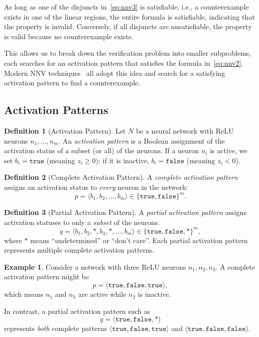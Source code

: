 \documentclass[oneside,11pt,dvipsnames]{book}
\numberwithin{equation}{section}
\theoremstyle{definition}
\newtheorem{definition}{Definition}[section]
\newtheorem{example}{Example}[section]
\theoremstyle{remark}
\begin{document}
As long as one of the disjuncts in~\autoref{eq:nnv3} is satisfiable, i.e., a counterexample exists in one of the linear regions, the entire formula is satisfiable, indicating that the property is invalid. Conversely, if all disjuncts are unsatisfiable, the property is valid because no counterexample exists.

This allows us to break down the verification problem into smaller subproblems, each searches for an activation pattern that satisfies the formula in~\autoref{eq:nnv2}.
Modern NNV techniques~\cite{bunel2020branch,wang2021beta,ferrari2022complete,duong2024harnessing,duong2023dpllt,ovalbab,katz2019marabou,bak2021nnenum} all adopt this idea and search for a satisfying activation pattern to find a counterexample.

\subsection{Activation Patterns}
\begin{definition}[Activation Pattern]\label{def:activation-pattern}
Let $N$ be a neural network with ReLU neurons $n_1,\dots,n_m$.
An \emph{activation pattern} is a Boolean assignment of the activation status of a subset (or all) of the neurons.
If a neuron $n_i$ is active, we set $b_i = \texttt{true}$ (meaning $z_i \geq 0$); if it is inactive, $b_i = \texttt{false}$ (meaning $z_i < 0$).
\end{definition}

\begin{definition}[Complete Activation Pattern]\label{def:complete-pattern}
A \emph{complete activation pattern} assigns an activation status to \emph{every} neuron in the network:
\[
p = \langle b_1, b_2, \dots, b_m \rangle \in \{\texttt{true},\texttt{false}\}^m .
\]
\end{definition}


\begin{definition}[Partial Activation Pattern]\label{def:partial-pattern}
A \emph{partial activation pattern} assigns activation statuses to only a \emph{subset} of the neurons.
\[
q = \langle b_1, b_2, *, b_4, *, \dots, b_m \rangle \in \{\texttt{true},\texttt{false},*\}^m ,
\]
where $*$ means ``undetermined'' or ``don't care''. Each partial activation pattern represents multiple complete activation patterns.
\end{definition}




\begin{example}
Consider a network with three ReLU neurons $n_1,n_2,n_3$.
A complete activation pattern might be
\[
p = \langle \texttt{true}, \texttt{false}, \texttt{true} \rangle ,
\]
which means $n_1$ and $n_3$ are active while $n_2$ is inactive.


In contrast, a partial activation pattern such as
\[
q = \langle \texttt{true}, \texttt{false}, * \rangle
\]
represents \emph{both} complete patterns
$\langle \texttt{true}, \texttt{false}, \texttt{true} \rangle$ and
$\langle \texttt{true}, \texttt{false}, \texttt{false} \rangle$.
\end{example}
\end{document}
